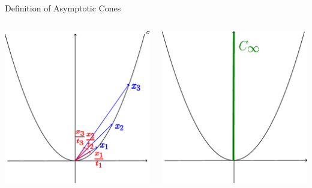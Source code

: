 \documentclass[aspectratio=169, dvipdfmx, 11pt]{beamer} %
\begin{document}
\begin{frame}{Definition of Asymptotic Cones}
  \centering
  \begin{columns}
    \pause
    \begin{column}{0.48\textwidth}
    \centering
    \includegraphics[keepaspectratio, scale=0.09]{figures/figure_asymptotic_cone_1.eps}
    \end{column}
    \pause
    \begin{column}{0.48\textwidth}
    \centering
    \includegraphics[keepaspectratio, scale=0.09]{figures/figure_asymptotic_cone_2.eps}
    \end{column}
  \end{columns}
\end{frame}
\end{document}
